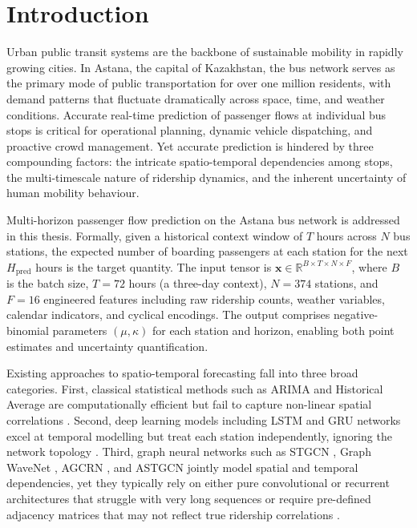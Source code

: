 %
%
\chapter{Introduction}
\label{chap:intro}
\setlength{\parskip}{1em}

Urban public transit systems are the backbone of sustainable mobility in rapidly growing cities. In Astana, the capital of Kazakhstan, the bus network serves as the primary mode of public transportation for over one million residents, with demand patterns that fluctuate dramatically across space, time, and weather conditions. Accurate real-time prediction of passenger flows at individual bus stops is critical for operational planning, dynamic vehicle dispatching, and proactive crowd management. Yet accurate prediction is hindered by three compounding factors: the intricate spatio-temporal dependencies among stops, the multi-timescale nature of ridership dynamics, and the inherent uncertainty of human mobility behaviour.

Multi-horizon passenger flow prediction on the Astana bus network is addressed in this thesis. Formally, given a historical context window of $T$ hours across $N$ bus stations, the expected number of boarding passengers at each station for the next $H_{\text{pred}}$ hours is the target quantity. The input tensor is $\mathbf{x} \in \mathbb{R}^{B \times T \times N \times F}$, where $B$ is the batch size, $T = 72$ hours (a three-day context), $N = 374$ stations, and $F = 16$ engineered features including raw ridership counts, weather variables, calendar indicators, and cyclical encodings. The output comprises negative-binomial parameters $(\mu, \kappa)$ for each station and horizon, enabling both point estimates and uncertainty quantification.

Existing approaches to spatio-temporal forecasting fall into three broad categories. First, classical statistical methods such as ARIMA and Historical Average are computationally efficient but fail to capture non-linear spatial correlations \cite{jeong2014supervised,toque2017short}. Second, deep learning models including LSTM \cite{hochreiter1997long} and GRU networks \cite{cho2014rnnencoder} excel at temporal modelling but treat each station independently, ignoring the network topology \cite{wei2018generalized,liu2018revealing}. Third, graph neural networks such as STGCN \cite{yu2018stgcn}, Graph WaveNet \cite{wu2019graphwavenet}, AGCRN \cite{bai2020adaptive}, and ASTGCN \cite{guo2019astgcn} jointly model spatial and temporal dependencies, yet they typically rely on either pure convolutional or recurrent architectures that struggle with very long sequences or require pre-defined adjacency matrices that may not reflect true ridership correlations \cite{zhang2021deep,ke2017short}.

